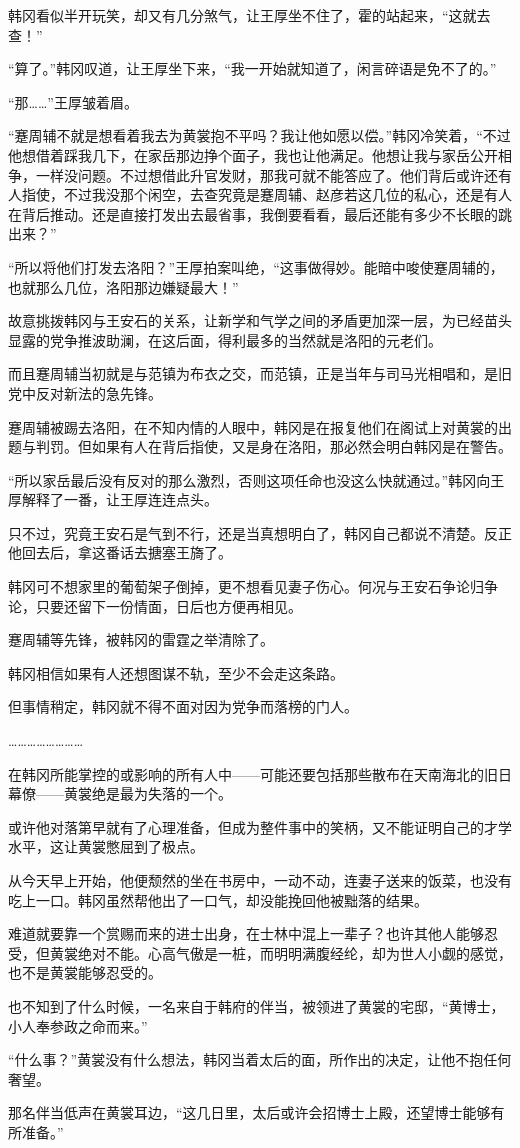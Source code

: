 韩冈看似半开玩笑，却又有几分煞气，让王厚坐不住了，霍的站起来，“这就去查！”

“算了。”韩冈叹道，让王厚坐下来，“我一开始就知道了，闲言碎语是免不了的。”

“那……”王厚皱着眉。

“蹇周辅不就是想看着我去为黄裳抱不平吗？我让他如愿以偿。”韩冈冷笑着，“不过他想借着踩我几下，在家岳那边挣个面子，我也让他满足。他想让我与家岳公开相争，一样没问题。不过想借此升官发财，那我可就不能答应了。他们背后或许还有人指使，不过我没那个闲空，去查究竟是蹇周辅、赵彦若这几位的私心，还是有人在背后推动。还是直接打发出去最省事，我倒要看看，最后还能有多少不长眼的跳出来？”

“所以将他们打发去洛阳？”王厚拍案叫绝，“这事做得妙。能暗中唆使蹇周辅的，也就那么几位，洛阳那边嫌疑最大！”

故意挑拨韩冈与王安石的关系，让新学和气学之间的矛盾更加深一层，为已经苗头显露的党争推波助澜，在这后面，得利最多的当然就是洛阳的元老们。

而且蹇周辅当初就是与范镇为布衣之交，而范镇，正是当年与司马光相唱和，是旧党中反对新法的急先锋。

蹇周辅被踢去洛阳，在不知内情的人眼中，韩冈是在报复他们在阁试上对黄裳的出题与判罚。但如果有人在背后指使，又是身在洛阳，那必然会明白韩冈是在警告。

“所以家岳最后没有反对的那么激烈，否则这项任命也没这么快就通过。”韩冈向王厚解释了一番，让王厚连连点头。

只不过，究竟王安石是气到不行，还是当真想明白了，韩冈自己都说不清楚。反正他回去后，拿这番话去搪塞王旖了。

韩冈可不想家里的葡萄架子倒掉，更不想看见妻子伤心。何况与王安石争论归争论，只要还留下一份情面，日后也方便再相见。

蹇周辅等先锋，被韩冈的雷霆之举清除了。

韩冈相信如果有人还想图谋不轨，至少不会走这条路。

但事情稍定，韩冈就不得不面对因为党争而落榜的门人。

……………………

在韩冈所能掌控的或影响的所有人中——可能还要包括那些散布在天南海北的旧日幕僚——黄裳绝是最为失落的一个。

或许他对落第早就有了心理准备，但成为整件事中的笑柄，又不能证明自己的才学水平，这让黄裳憋屈到了极点。

从今天早上开始，他便颓然的坐在书房中，一动不动，连妻子送来的饭菜，也没有吃上一口。韩冈虽然帮他出了一口气，却没能挽回他被黜落的结果。

难道就要靠一个赏赐而来的进士出身，在士林中混上一辈子？也许其他人能够忍受，但黄裳绝对不能。心高气傲是一桩，而明明满腹经纶，却为世人小觑的感觉，也不是黄裳能够忍受的。

也不知到了什么时候，一名来自于韩府的伴当，被领进了黄裳的宅邸，“黄博士，小人奉参政之命而来。”

“什么事？”黄裳没有什么想法，韩冈当着太后的面，所作出的决定，让他不抱任何奢望。

那名伴当低声在黄裳耳边，“这几日里，太后或许会招博士上殿，还望博士能够有所准备。”
